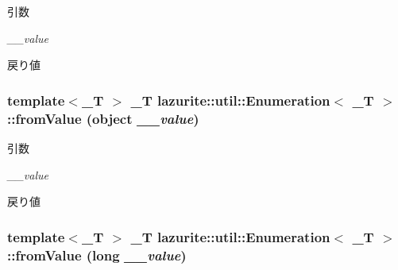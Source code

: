 \begin{DoxyParams}{引数}
\item[{\em \_\-\_\-value}]\end{DoxyParams}
\begin{DoxyReturn}{戻り値}

\end{DoxyReturn}
\hypertarget{classlazurite_1_1util_1_1_enumeration_3_01___t_01_4_aa5b7469adb072551effe4793e6b61692}{
\subsubsection[{fromValue}]{\setlength{\rightskip}{0pt plus 5cm}template$<$\_\-T $>$ \_\-T lazurite::util::Enumeration$<$ \_\-T $>$::fromValue (object {\em \_\-\_\-value})}}
\label{classlazurite_1_1util_1_1_enumeration_3_01___t_01_4_aa5b7469adb072551effe4793e6b61692}

\begin{DoxyParams}{引数}
\item[{\em \_\-\_\-value}]\end{DoxyParams}
\begin{DoxyReturn}{戻り値}

\end{DoxyReturn}
\hypertarget{classlazurite_1_1util_1_1_enumeration_3_01___t_01_4_af361a605b48f0635812956e1a2425afd}{
\subsubsection[{fromValue}]{\setlength{\rightskip}{0pt plus 5cm}template$<$\_\-T $>$ \_\-T lazurite::util::Enumeration$<$ \_\-T $>$::fromValue (long {\em \_\-\_\-value})}}
\label{classlazurite_1_1util_1_1_enumeration_3_01___t_01_4_af361a605b48f0635812956e1a2425afd}

